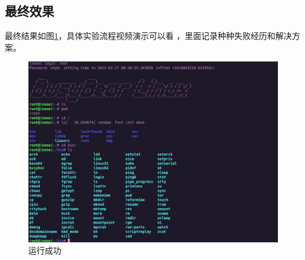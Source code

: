 \subsection{最终效果}
最终结果如图\ref{fig:success}，具体实验流程视频演示可以看 \cite{结果演示}，里面记录种种失败经历和解决方案。
\begin{figure}[htbp]
  \centering %
  \includegraphics[width=0.9 \textwidth]{figs/Process/success.png}
  \caption{运行成功}
  \label{fig:success} %
\end{figure}









